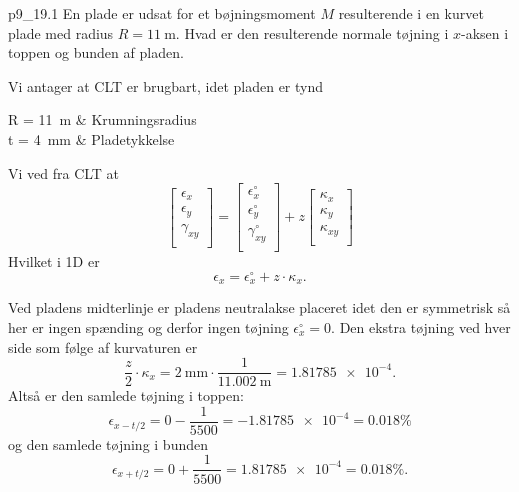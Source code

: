 
\begin{problemwithimage}{p9_1}{9.1}
  En plade er udsat for et bøjningsmoment $M$ resulterende i en kurvet plade med radius $R = \qty{11}{\m}$.
  Hvad er den resulterende normale tøjning i $x$-aksen i toppen og bunden af pladen.
\end{problemwithimage}

\begin{assumptions}
  \item Vi antager at CLT er brugbart, idet pladen er tynd
\end{assumptions}

\begin{givens}
  R = \qty{11}{\m}  & Krumningsradius \\
  t = \qty{4}{\mm} & Pladetykkelse
\end{givens}

\begin{derivation}
  Vi ved fra CLT at
  \begin{equation*}
    \begin{bmatrix}
      \epsilon_x\\
    \epsilon_y\\
    \gamma_{xy}\\
    \end{bmatrix} = \begin{bmatrix}
      \epsilon_{x}^{\circ}\\
    \epsilon_{y}^{\circ}\\
    \gamma_{xy}^{\circ}\\
    \end{bmatrix} + z \begin{bmatrix}
      \kappa_{x}\\
    \kappa_y\\
    \kappa_{xy}\\
    \end{bmatrix}
  \end{equation*}
  Hvilket i 1D er
  \begin{equation*}
    \epsilon_x = \epsilon_x^{\circ} + z\cdot \kappa_{x} 
  .\end{equation*}

  Ved pladens midterlinje er pladens neutralakse placeret idet den er symmetrisk så her er ingen spænding og derfor ingen tøjning $\epsilon_x^{\circ} = 0$.
  Den ekstra tøjning ved hver side som følge af kurvaturen er
  \begin{equation*}
    \frac{z}{2} \cdot \kappa_x = \qty{2}{\mm} \cdot \frac{1}{\qty{11,002}{\m} }  = \num{1,81785e-4}
  .\end{equation*}
  Altså er den samlede tøjning i toppen:
  \begin{equation*}
  \epsilon_{x-t / 2} = 0 - \frac{1}{5500} = \num{-1,81785e-4} = \num{0,018}\%
  \end{equation*}
  og den samlede tøjning i bunden
  \begin{equation*}
    \epsilon_{x+t / 2} = 0 + \frac{1}{5500} = \num{1,81785e-4} = \num{0,018} \%
  .\end{equation*}
\end{derivation}

